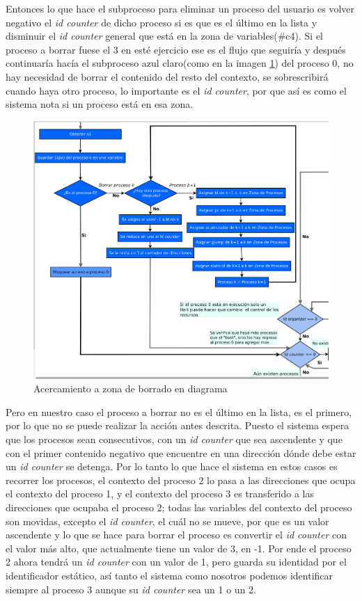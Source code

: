 \documentclass[letterpaper,12pt,oneside]{book}
\begin{document}
		Entonces lo que hace el subproceso para eliminar un proceso del usuario es volver negativo el \textit{id counter} de dicho proceso
		si es que es el último en la lista y disminuir el \textit{id counter} general que está en la zona de variables(\#c4). Si el proceso a borrar 
		fuese el 3 en esté ejercicio ese es el flujo que seguiría y después continuaría hacía el subproceso azul claro(como en la imagen 
		\ref{fig:diagZonaBorrado}) del proceso 0, no hay necesidad 
		de borrar el contenido del resto
		del contexto, se sobrescribirá cuando haya otro proceso, lo importante es el \textit{id counter}, por que así es como el sistema nota
		si un proceso está en esa zona.
		
		
		\begin{figure}[h]		
			\centering
			\includegraphics[scale=0.45]{media/CARDIACC/diagZOnaBorrado.png}
			\caption{ Acercamiento a zona de borrado en diagrama}
			\label{fig:diagZonaBorrado}
		\end{figure}
		
		Pero en nuestro caso el proceso a borrar no es el último en la lista, es el primero, por lo que no se puede realizar la acción antes
		descrita. Puesto el sistema espera que los procesos sean consecutivos, con un \textit{id counter} que sea ascendente y que con el
		primer contenido negativo que encuentre en una dirección dónde debe estar un \textit{id counter} se detenga. Por lo tanto lo que hace el sistema
		en estos casos
		es recorrer los procesos, el contexto del proceso 2 lo pasa a las direcciones que ocupa el contexto del proceso 1, y el contexto del proceso
		3 es transferido a las direcciones que ocupaba el proceso 2; todas las variables del contexto del proceso son movidas, excepto el \textit{id counter}, el
		cuál no se mueve, por que es un valor ascendente y lo que se hace para borrar el proceso es convertir el \textit{id counter} con el valor más 
		alto, que actualmente tiene
		un valor de 3, en -1. Por ende el proceso 2 ahora tendrá un \textit{id counter} con un valor de 1, pero guarda
		su identidad por el identificador estático, así tanto el sistema como nosotros podemos identificar siempre al proceso 3 aunque su
		\textit{id counter} sea un 1 o un 2.
		
\end{document}
